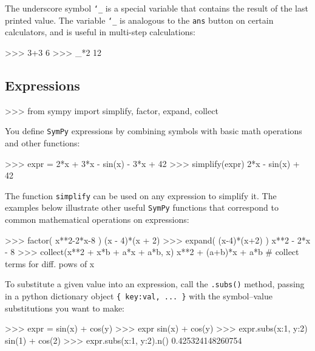 The underscore symbol \texttt{\char`_} is a special variable that contains the result of the last printed value.
The variable \texttt{\char`_} is analogous to the \texttt{ans} button on certain calculators,
and is useful in multi-step calculations:

\small
\begin{verbatimtab}
>>> 3+3
6
>>> _*2
12
\end{verbatimtab}
\normalsize


\subsection{Expressions}
\label{basics:expressions}

\small
\begin{verbatimtab}
>>> from sympy import simplify, factor, expand, collect
\end{verbatimtab}
\normalsize

\noindent
You define \texttt{SymPy} expressions by combining symbols with basic math operations and other functions: 

\small
\begin{verbatimtab}
>>> expr = 2*x + 3*x - sin(x) - 3*x + 42
>>> simplify(expr)
2*x - sin(x) + 42
\end{verbatimtab}
\normalsize

\noindent
The function \texttt{simplify} can be used on any expression to simplify it.
The examples below illustrate other useful \texttt{SymPy} functions
that correspond to common mathematical operations on expressions: 

																								  

\small
\begin{verbatimtab}
>>> factor( x**2-2*x-8 )
(x - 4)*(x + 2)
>>> expand( (x-4)*(x+2) )
x**2 - 2*x - 8
>>> collect(x**2 + x*b + a*x + a*b, x)
x**2 + (a+b)*x + a*b     # collect terms for diff. pows of x 
\end{verbatimtab}
\normalsize

\noindent
To substitute a given value into an expression,																
call the \texttt{.subs()} method, passing in a python dictionary object \texttt{\{ key:val, ... \}} 
with the symbol--value substitutions you want to make:

\small
\begin{verbatimtab}
>>> expr  = sin(x) + cos(y)
>>> expr
sin(x) + cos(y)
>>> expr.subs({x:1, y:2})
sin(1) + cos(2)
>>> expr.subs({x:1, y:2}).n()
0.425324148260754
\end{verbatimtab}
\normalsize

